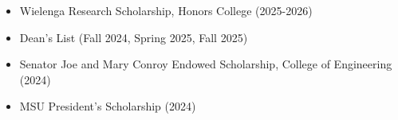 \documentclass[9pt]{developercv} %
\begin{document}
\vspace{-10pt}
\begin{itemize}
	\item Wielenga Research Scholarship, Honors College (2025-2026)
	\item Dean's List (Fall 2024, Spring 2025, Fall 2025)
	\item Senator Joe and Mary Conroy Endowed Scholarship, College of Engineering (2024)
	\item MSU President's Scholarship (2024)
\end{itemize}
\end{document}
